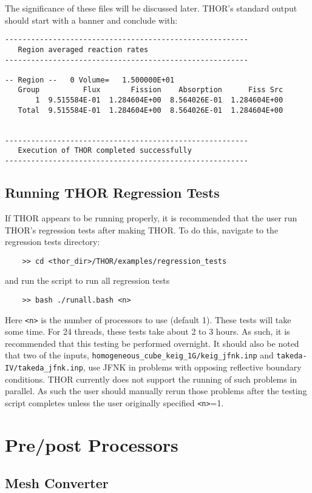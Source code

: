 The significance of these files will be discussed later.
THOR's standard output should start with a banner and conclude with:
\begin{verbatim}
--------------------------------------------------------
   Region averaged reaction rates
--------------------------------------------------------

-- Region --   0 Volume=   1.500000E+01
   Group          Flux       Fission    Absorption      Fiss Src
       1  9.515584E-01  1.284604E+00  8.564026E-01  1.284604E+00
   Total  9.515584E-01  1.284604E+00  8.564026E-01  1.284604E+00


--------------------------------------------------------
   Execution of THOR completed successfully
--------------------------------------------------------
\end{verbatim}

\subsection{Running THOR Regression Tests}

If THOR appears to be running properly, it is recommended that the user run THOR's regression tests after making THOR.
To do this, navigate to the regression tests directory:
\begin{verbatim}
    >> cd <thor_dir>/THOR/examples/regression_tests
\end{verbatim}
and run the script to run all regression tests
\begin{verbatim}
    >> bash ./runall.bash <n>
\end{verbatim}
Here \verb"<n>" is the number of processors to use (default 1).
These tests will take some time.
For 24 threads, these tests take about 2 to 3 hours.
As such, it is recommended that this testing be performed overnight.
It should also be noted that two of the inputs, \verb"homogeneous_cube_keig_1G/keig_jfnk.inp" and \verb"takeda-IV/takeda_jfnk.inp", use JFNK in problems with opposing reflective boundary conditions.
THOR currently does not support the running of such problems in parallel.
As such the user should manually rerun those problems after the testing script completes unless the user originally specified \verb"<n>"=1.

\section{Pre/post Processors}

\subsection{Mesh Converter}\label{ch:getstart:sec:preproc:subsec:meshconv}

